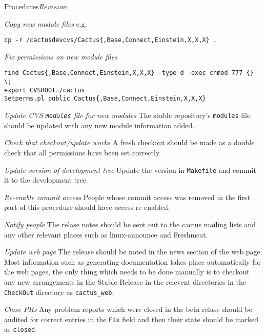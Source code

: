 \begin{cactuspart}{2}{Procedures}{}{$Revision$}
\begin{Lentry}
\item[{\em Copy new module files}]
e.g.
\begin{verbatim}
cp -r /cactusdevcvs/Cactus{,Base,Connect,Einstein,X,X,X} .
\end{verbatim}
\item[{\em Fix permissions on new module files}]
\begin{verbatim}
find Cactus{,Base,Connect,Einstein,X,X,X} -type d -exec chmod 777 {} \;
export CVSROOT=/cactus
Setperms.pl public Cactus{,Base,Connect,Einstein,X,X,X}
\end{verbatim}
\item[{\em Update CVS {\tt modules} file for new modules}]
The stable repository's {\tt modules} file should be updated with any
new module information added. 
\item[{\em Check that checkout/update works}]
A fresh checkout should be made as a double check that all permissions 
have been set correctly.
\item[{\em Update version of development tree}]
Update the version in {\tt Makefile} and commit it to the development
tree.
\item[{\em Re-enable commit access}]
People whose commit access was removed in the first part of this
procedure should have access re-enabled.
\item[{\em Notify people}]
The relase notes should be sent out to the cactus mailing lists and
any other relevant places such as linux-announce and Freshmeat.
\item[{\em Update web page}]
The release should be noted in the news section of the web page.
Most information such as generating documentation takes place automatically 
for the web pages, the only thing which needs to be done manually is to
checkout any new arrangements in the Stable Release in the relevent 
directories in the {\tt CheckOut} directory as {\tt cactus\_web}.
\item[{\em Close PRs}]
Any problem reports which were closed in the beta relase should be
audited for correct entries in the {\tt Fix} field and then their
state should be marked as {\tt closed}.
\end{Lentry}


\end{cactuspart}

